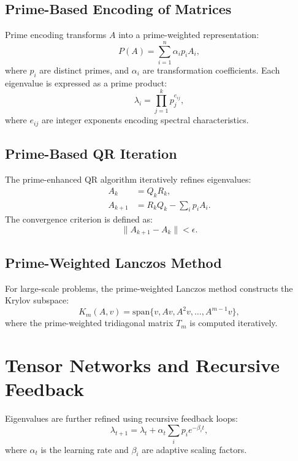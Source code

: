 \documentclass{article}
\theoremstyle{plain}
\theoremstyle{plain}
\theoremstyle{definition}
\theoremstyle{remark}
\begin{document}
\subsection{Prime-Based Encoding of Matrices}
Prime encoding transforms $A$ into a prime-weighted representation:
\begin{equation}
    P(A) = \sum_{i=1}^{n} \alpha_i p_i A_i,
\end{equation}
where $p_i$ are distinct primes, and $\alpha_i$ are transformation coefficients. Each eigenvalue is expressed as a prime product:
\begin{equation}
    \lambda_i = \prod_{j=1}^{k} p_j^{e_{ij}},
\end{equation}
where $e_{ij}$ are integer exponents encoding spectral characteristics.

\subsection{Prime-Based QR Iteration}
The prime-enhanced QR algorithm iteratively refines eigenvalues:
\begin{align}
    A_k &= Q_k R_k, \\
    A_{k+1} &= R_k Q_k - \sum_{i} p_i A_i.
\end{align}
The convergence criterion is defined as:
\begin{equation}
    \| A_{k+1} - A_k \| < \epsilon.
\end{equation}

\subsection{Prime-Weighted Lanczos Method}
For large-scale problems, the prime-weighted Lanczos method constructs the Krylov subspace:
\begin{equation}
    K_m(A, v) = \text{span} \{ v, A v, A^2 v, \dots, A^{m-1} v \},
\end{equation}
where the prime-weighted tridiagonal matrix $T_m$ is computed iteratively.

\section{Tensor Networks and Recursive Feedback}
Eigenvalues are further refined using recursive feedback loops:
\begin{equation}
    \lambda_{t+1} = \lambda_t + \alpha_t \sum_{i} p_i e^{-\beta_i t},
\end{equation}
where $\alpha_t$ is the learning rate and $\beta_i$ are adaptive scaling factors.
\end{document}
